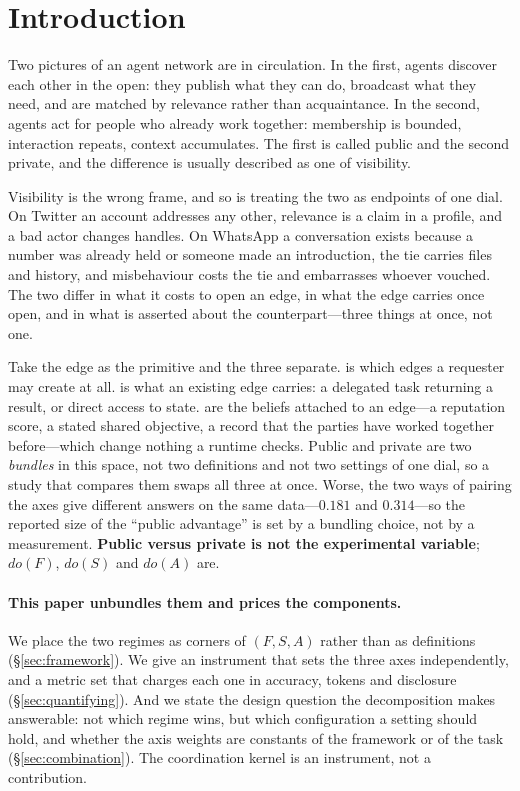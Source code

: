 \section{Introduction}

Two pictures of an agent network are in circulation. In the first, agents discover each
other in the open: they publish what they can do, broadcast what they need, and are
matched by relevance rather than acquaintance. In the second, agents act for people who
already work together: membership is bounded, interaction repeats, context accumulates.
The first is called public and the second private, and the difference is usually
described as one of visibility.

Visibility is the wrong frame, and so is treating the two as endpoints of one dial.
On Twitter an account addresses any other, relevance is a claim in a profile, and a bad
actor changes handles. On WhatsApp a conversation exists because a number was already held
or someone made an introduction, the tie carries files and history, and misbehaviour costs
the tie and embarrasses whoever vouched. The two differ in what it costs to open an edge,
in what the edge carries once open, and in what is asserted about the counterpart---three
things at once, not one.

Take the edge as the primitive and the three separate.  is which edges a requester may create at all.  is what an existing edge carries: a delegated task returning a result, or
direct access to state.  are the beliefs attached to an edge---a
reputation score, a stated shared objective, a record that the parties have worked together
before---which change nothing a runtime checks. Public and private are two \emph{bundles}
in this space, not two definitions and not two settings of one dial, so a study that
compares them swaps all three at once. Worse, the two ways of pairing the axes give
different answers on the same data---$0.181$ and $0.314$---so the reported size of the
``public advantage'' is set by a bundling choice, not by a measurement. \textbf{Public versus private is not the experimental
variable}; $do(F)$, $do(S)$ and $do(A)$ are.

\paragraph{This paper unbundles them and prices the components.} We place the two regimes
as corners of $(F,S,A)$ rather than as definitions (\S\ref{sec:framework}). We give an
instrument that sets the three axes independently, and a metric set that charges each one
in accuracy, tokens and disclosure (\S\ref{sec:quantifying}). And we state the design
question the decomposition makes answerable: not which regime wins, but which configuration
a setting should hold, and whether the axis weights are constants of the framework or of
the task (\S\ref{sec:combination}). The coordination kernel is an instrument, not a
contribution.

